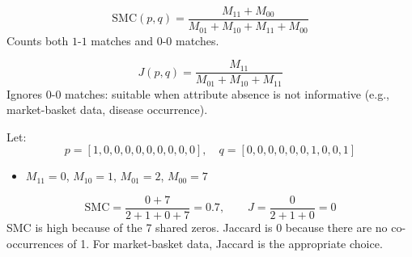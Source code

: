 \begin{center}
\end{center}

\begin{definition}
\begin{equation}
  \mathrm{SMC}(p, q) = \frac{M_{11} + M_{00}}{M_{01} + M_{10} + M_{11} + M_{00}}
  \label{eq:smc}
\end{equation}
Counts both $1$-$1$ matches and $0$-$0$ matches.
\end{definition}

\begin{definition}
\begin{equation}
  J(p, q) = \frac{M_{11}}{M_{01} + M_{10} + M_{11}}
  \label{eq:jaccard}
\end{equation}
Ignores $0$-$0$ matches: suitable when attribute absence is not informative (e.g., market-basket data, disease occurrence).
\end{definition}

\begin{example}
Let:
\[
  p = [1, 0, 0, 0, 0, 0, 0, 0, 0, 0], \quad q = [0, 0, 0, 0, 0, 0, 1, 0, 0, 1]
\]
\begin{itemize}
  \item $M_{11} = 0$, $M_{10} = 1$, $M_{01} = 2$, $M_{00} = 7$
\end{itemize}
\[
  \mathrm{SMC} = \frac{0+7}{2+1+0+7} = 0.7, \qquad J = \frac{0}{2+1+0} = 0
\]
SMC is high because of the 7 shared zeros. Jaccard is 0 because there are no co-occurrences of 1. For market-basket data, Jaccard is the appropriate choice.
\end{example}


